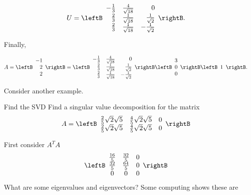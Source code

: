\begin{solution}
\[ U = \leftB\begin{array}{rrr} -\frac{1}{3} & \frac{4}{\sqrt{18}} & 0 \\
\frac{2}{3} & \frac{1}{\sqrt{18}} & \frac{1}{\sqrt 2} \\
\frac{2}{3} & \frac{1}{\sqrt{18}} & -\frac{1}{\sqrt 2} \end{array}\rightB.\]

Finally,

\[ A = 
\leftB\begin{array}{r} -1 \\ 2 \\ 2 \end{array}\rightB
=
\leftB\begin{array}{rrr} -\frac{1}{3} & \frac{4}{\sqrt{18}} & 0 \\
\frac{2}{3} & \frac{1}{\sqrt{18}} & \frac{1}{\sqrt 2} \\
\frac{2}{3} & \frac{1}{\sqrt{18}} & -\frac{1}{\sqrt 2} \end{array}\rightB
\leftB\begin{array}{r} 3 \\ 0 \\ 0 \end{array}\rightB
\leftB\begin{array}{r} 1 \end{array}\rightB.\]

\end{solution}

Consider another example.

\begin{example}{Find the SVD}\label{exa:SVD3}
Find a singular value decomposition for the matrix 
\begin{equation*}
A= \leftB  
\begin{array}{ccc}
\frac{2}{5}\sqrt{2}\sqrt{5} & \frac{4}{5}\sqrt{2}\sqrt{5} & 0 \\ 
\frac{2}{5}\sqrt{2}\sqrt{5} & \frac{4}{5}\sqrt{2}\sqrt{5} & 0
\end{array}
\rightB
\end{equation*}
\end{example}

First consider $A^TA$
\begin{equation*}
\leftB 
\begin{array}{ccc}
\frac{16}{5} & \frac{32}{5} & 0 \\ 
\frac{32}{5} & \frac{64}{5} & 0 \\ 
0 & 0 & 0
\end{array}
\rightB
\end{equation*}
What are some eigenvalues and eigenvectors? Some computing shows these are

